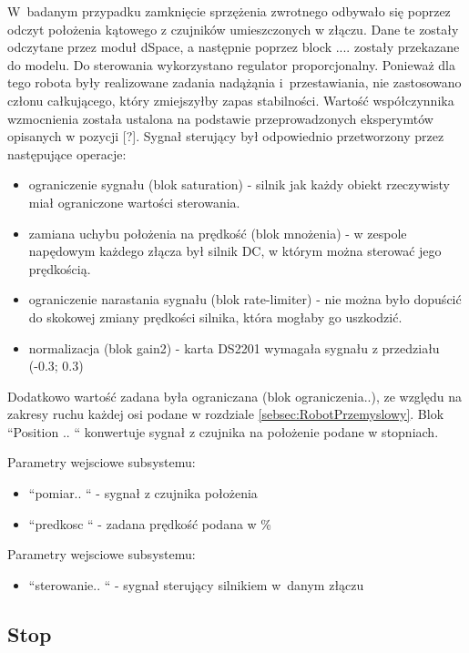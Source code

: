 
W~badanym przypadku zamknięcie sprzężenia zwrotnego odbywało się poprzez odczyt położenia kątowego z czujników umieszczonych w złączu. Dane te zostały odczytane przez moduł dSpace, a następnie poprzez block .... zostały przekazane do modelu. Do sterowania wykorzystano regulator proporcjonalny. Ponieważ dla tego robota były realizowane zadania nadążąnia i~przestawiania, nie zastosowano członu całkującego, który zmiejszyłby zapas stabilności. Wartość współczynnika wzmocnienia została ustalona na podstawie przeprowadzonych eksperymtów opisanych w pozycji [?]. %
Sygnał sterujący był odpowiednio przetworzony przez następujące operacje:
\begin{itemize}
\item ograniczenie sygnału (blok saturation) - silnik jak każdy obiekt rzeczywisty miał ograniczone wartości sterowania.
\item {} zamiana uchybu położenia na prędkość {} (blok mnożenia) - w zespole napędowym każdego złącza był silnik DC, w którym można sterować jego prędkością.
\item ograniczenie narastania sygnału (blok rate-limiter) - nie można było dopuścić do skokowej zmiany prędkości silnika, która mogłaby go uszkodzić.
\item normalizacja (blok gain2) -  karta DS2201 wymagała sygnału z przedziału (-0.3; 0.3)
\end{itemize}
Dodatkowo wartość zadana była ograniczana (blok ograniczenia..), ze względu na zakresy ruchu każdej osi podane w rozdziale \ref{sebsec:RobotPrzemyslowy}.
Blok ``Position .. `` konwertuje sygnał z czujnika na położenie podane w stopniach.

\noindent Parametry wejsciowe subsystemu:
\begin{itemize}
\item``pomiar.. `` - sygnał z czujnika położenia
\item ``predkosc `` - zadana prędkość podana w \%
\end{itemize}
\noindent Parametry wejsciowe subsystemu:
\begin{itemize}
\item ``sterowanie.. `` - sygnał sterujący silnikiem w~danym złączu 
\end{itemize}

\subsection{Stop}
\label{subsec:Stop}

